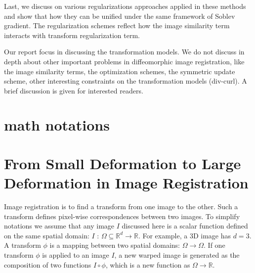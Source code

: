\documentclass[letterpaper,12pt]{article}
\begin{document}
Last, we discuss on various regularizations approaches applied in these methods and show that how they can be unified under the same framework of Soblev gradient. The regularization schemes reflect how the image similarity term interacts with transform regularization term.




Our report focus in discussing the transformation models. We do not discuss in depth about other important problems in diffeomorphic image registration, like the image similarity terms, the optimization schemes, the symmetric update scheme, other interesting constraints on the transformation models (div-curl). A brief discussion is given for interested readers.

\section{math notations}

\newcommand{\vect}[1]{\mathbf{#1}}
\newcommand{\field}[1]{\mathbf{#1}}
\newcommand{\image}[1]{#1}
\newcommand{\I}{\image{I}}
\newcommand{\J}{\image{J}}
\renewcommand{\u}{\vect{u}}
\renewcommand{\v}{\vect{v}}
\renewcommand{\c}{\vect{c}}
\newcommand{\h}{\vect{h}}
\newcommand{\w}{\vect{w}}
\newcommand{\myphi}{\phi}
\newcommand{\mypsi}{\psi}
\newcommand{\D}{D}
\renewcommand{\d}{\nabla}
\newcommand{\dd}{\text{d}}
\newcommand{\p}{\partial}
\renewcommand{\L}{\Delta} %
\newcommand{\R}{\mathbb{R}}
\newcommand{\myS}{S}
\newcommand{\myR}{R}
\newcommand{\myE}{E}
\newcommand{\ld}{\langle}
\newcommand{\rd}{\rangle}
\newcommand{\LL}{\mathcal{L}} %
\newcommand{\tQ}{\mathcal{Q}}
\newcommand{\Id}{\text{Id}}
\newcommand{\tG}{{G}} %
\newcommand{\Diff}{\text{Diff}}
\newcommand{\VV}{\mathcal{V}}
\newcommand{\opL}{\mathcal{L}}

\section{From Small Deformation to Large Deformation in Image Registration}

Image registration is to find a transform from one image to the other. Such a transform defines pixel-wise correspondences between two images. 
To simplify notations we assume that any image $\I$ discussed here is a scalar function defined on the same spatial domain: $\I$ : $\Omega \subseteq \R^d \to \R$. 
For example, a 3D image has $d=3$. A transform $\myphi$ is a mapping between two spatial domains: $\Omega \rightarrow \Omega$. 
If one transform $\myphi$ is applied to an image $I$, a new warped image is generated as the composition of two functions $\I \circ \myphi$, which is a new function as $\Omega \to \R$. 
\end{document}
